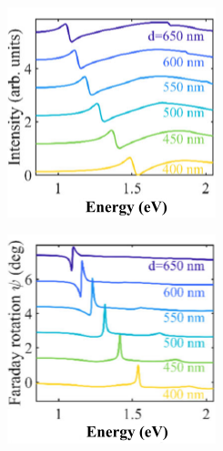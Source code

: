 \documentclass[13pt]{article}
\begin{document}
\begin{figure}[hbt]
	\centering
	\begin{subfigure}[]{.49\linewidth}
		\centering
		\includegraphics[width=\linewidth]{Figures/figure2a.png}
		\caption{}
		\label{}
	\end{subfigure}
	\hfill
	\begin{subfigure}[]{.49\linewidth}
		\centering
		\includegraphics[width=\linewidth]{Figures/figure2b.png}
		\caption{}
		\label{}
	\end{subfigure}


\end{figure}
\end{document}
